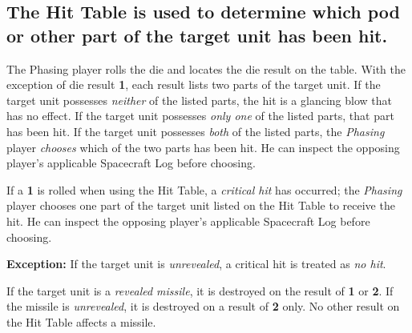 \subsection[Hit Results Table]{The Hit Table is used to determine
        which pod or other part 
  of the target unit has been hit.}
\label{sec:hit-table-used}



The Phasing player rolls the die and locates the die result on the
table. With the exception of die result \textbf{1}, each result lists
two parts of the target unit. If the target unit possesses
\emph{neither} of the listed parts, the hit is a glancing blow that
has no effect. If the target unit possesses \emph{only one} of the
listed parts, that part has been hit. If the target unit possesses
\emph{both} of the listed parts, the \emph{Phasing} player
\emph{chooses} which of the two parts has been hit. He can inspect the
opposing player's applicable Spacecraft Log before choosing.

If a \textbf{1} is rolled when using the Hit Table, a \emph{critical
  hit} has occurred; the \emph{Phasing} player chooses one part of the
target unit listed on the Hit Table to receive the hit. He can inspect
the opposing player's applicable Spacecraft Log before choosing.

\textbf{Exception:} If the target unit is \emph{unrevealed}, a critical hit
is treated as \emph{no hit}.

If the target unit is a \emph{revealed missile}, it is destroyed on
the result of \textbf{1} or \textbf{2}. If the missile is
\emph{unrevealed}, it is destroyed on a result of \textbf{2} only. No
other result on the Hit Table affects a missile.


